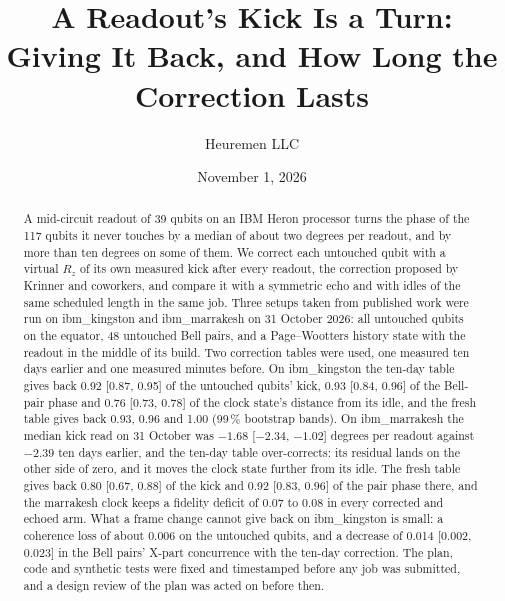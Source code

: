 \documentclass[reprint,amsmath,amssymb,aps,superscriptaddress,nofootinbib]{revtex4-2}
\begin{document}
\title{A Readout's Kick Is a Turn: Giving It Back, and How Long the Correction Lasts}

\author{Heuremen LLC}

\date{November 1, 2026}

\begin{abstract}
A mid-circuit readout of 39 qubits on an IBM Heron processor turns the phase of the 117 qubits it never touches by a median of about two degrees per readout, and by more than ten degrees on some of them. We correct each untouched qubit with a virtual $R_z$ of its own measured kick after every readout, the correction proposed by Krinner and coworkers, and compare it with a symmetric echo and with idles of the same scheduled length in the same job. Three setups taken from published work were run on ibm\_kingston and ibm\_marrakesh on 31 October 2026: all untouched qubits on the equator, 48 untouched Bell pairs, and a Page--Wootters history state with the readout in the middle of its build. Two correction tables were used, one measured ten days earlier and one measured minutes before. On ibm\_kingston the ten-day table gives back 0.92 [0.87, 0.95] of the untouched qubits' kick, 0.93 [0.84, 0.96] of the Bell-pair phase and 0.76 [0.73, 0.78] of the clock state's distance from its idle, and the fresh table gives back 0.93, 0.96 and 1.00 (99\,\% bootstrap bands). On ibm\_marrakesh the median kick read on 31 October was $-1.68$ [$-2.34$, $-1.02$] degrees per readout against $-2.39$ ten days earlier, and the ten-day table over-corrects: its residual lands on the other side of zero, and it moves the clock state further from its idle. The fresh table gives back 0.80 [0.67, 0.88] of the kick and 0.92 [0.83, 0.96] of the pair phase there, and the marrakesh clock keeps a fidelity deficit of 0.07 to 0.08 in every corrected and echoed arm. What a frame change cannot give back on ibm\_kingston is small: a coherence loss of about 0.006 on the untouched qubits, and a decrease of 0.014 [0.002, 0.023] in the Bell pairs' X-part concurrence with the ten-day correction. The plan, code and synthetic tests were fixed and timestamped before any job was submitted, and a design review of the plan was acted on before then.
\end{abstract}

\maketitle
\end{document}
